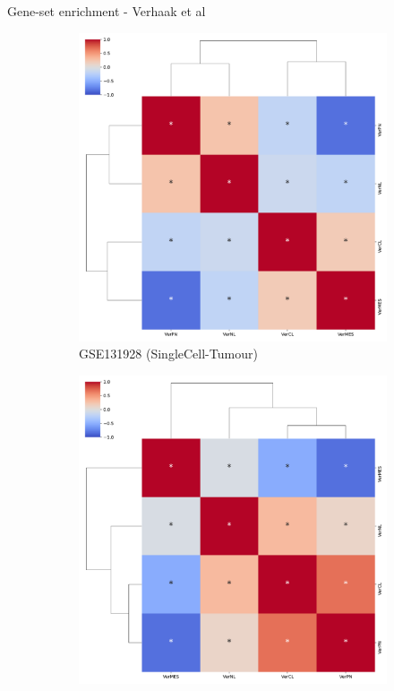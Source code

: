 \documentclass[aspectratio=169,9pt]{beamer}
\begin{document}
    \begin{frame}{Gene-set enrichment - Verhaak et al}
        \begin{adjustwidth}{-5cm}{-5cm}
            \centering
            \begin{figure}\ContinuedFloat
                \centering
                \begin{subfigure}[c]{0.48\textwidth}
                    \centering
                    \includegraphics[width=\textwidth]{GSEA_GSM3828672_corrplot_Ver}
                    \caption{GSE131928 (SingleCell-Tumour)}
                \end{subfigure}
                \begin{subfigure}[c]{0.48\textwidth}
                    \centering
                    \includegraphics[width=\textwidth]{GSEA_celllines_corrplot_Ver}

\end{subfigure}
\end{figure}
\end{adjustwidth}
\end{frame}
\end{document}
